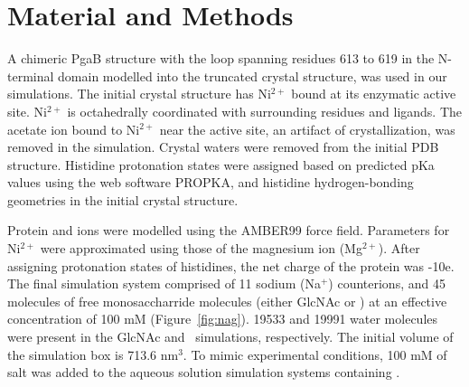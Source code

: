 
\section{Material and Methods}
A chimeric PgaB structure with the loop spanning residues 613 to 619 in the N-terminal domain modelled into the truncated crystal structure, was used in our simulations. The initial crystal structure has Ni$^{2+}$ bound at its enzymatic active site. Ni$^{2+}$ is octahedrally coordinated with surrounding residues and ligands.  The acetate ion bound to Ni$^{2+}$ near the active site, an artifact of crystallization, was removed in the simulation. Crystal waters were removed from the initial PDB structure. Histidine protonation states were assigned based on predicted pKa values using the web software PROPKA,\cite{Bas:2008ul,Olsson:2011vi,Sondergaard:2011ug} and histidine hydrogen-bonding geometries in the initial crystal structure.

Protein and ions were modelled using the AMBER99 force field.\cite{Cornell:1995td} Parameters for Ni$^{2+}$ were approximated using those of the magnesium ion (Mg$^{2+}$). After assigning protonation states of histidines, the net charge of the protein was -10e. The final simulation system comprised of 11 sodium (Na$^{+}$) counterions, and 45 molecules of free monosaccharride molecules (either GlcNAc or \glucosamine) at an effective concentration of 100 mM (Figure~\ref{fig:nag}). 19533 and 19991 water molecules were present in the GlcNAc and \glucosamine\ simulations, respectively. The initial volume of the simulation box is 713.6 nm$^{3}$.  To mimic experimental conditions, 100 mM of salt was added to the aqueous solution simulation systems containing \glucosamine.

